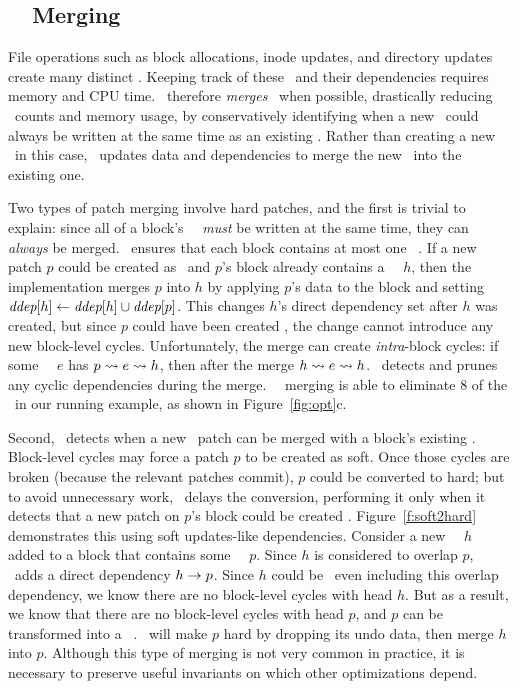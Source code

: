 
\subsection{\Nrb\ \Patch\ Merging}
\label{sec:patch:merge}

File operations such as block allocations, inode updates, and directory updates
create many distinct \patches. Keeping track of these
\patches\ and their dependencies requires memory and
CPU time.
%
\Kudos\ therefore \emph{merges} \patches\ when possible, drastically reducing
\patch\ counts and memory usage, by conservatively identifying when a
new \patch\ could always be written at the same time as an existing \patch.
%
Rather than creating a new \patch\ in this case, \Kudos\ updates data
and dependencies to merge the new \patch\ into the existing one.


Two types of patch merging involve hard patches, and the first is trivial
to explain:
%
since all of a block's \nrb\ \patches\ \emph{must} be written at the same
time, they can \emph{always} be merged.
%
\Kudos\ ensures that each block contains at most one \nrb\ \patch.
%
If a new patch $p$ could be created as \nrb\ and $p$'s
block already contains a \nrb\ \patch\ $h$, then
%
the implementation merges $p$ into $h$ by applying $p$'s data to the block
and setting $\textit{ddep}[h] \gets \textit{ddep}[h] \cup \textit{ddep}[p]$.
%
%
This changes $h$'s direct dependency set after $h$ was created, but
since $p$ could have been created \nrb, the change cannot introduce any new
block-level cycles.
%
Unfortunately, the merge can create \emph{intra}-block cycles:
%
if some \noop\ \patch\ $e$ has $p \leadsto e \leadsto h$, then after
the merge $h \leadsto e \leadsto h$.
%
\Kudos\ detects and prunes any cyclic
dependencies during the merge.
%
\Nrb\ \patch\ merging is able to eliminate 8 of the \patches\ in our running
example, as shown in Figure~\ref{fig:opt}c.


Second, \Featherstitch\ detects when a new \nrb\ patch can be merged with
 a block's existing \emph{\rb} \patches.
%
Block-level cycles may force a patch $p$ to be created as soft.
%
Once those cycles are broken (because the relevant patches commit), $p$
 could be converted to hard; but to avoid unnecessary work,
%
\Kudos\ delays the conversion, performing it only when it detects that a
 new patch on $p$'s block could be created \nrb.
%
Figure~\ref{f:soft2hard} demonstrates this using soft
 updates-like dependencies.
%
Consider a new \nrb\ \patch\ $h$ added to a block that
contains some \rb\ \patch\ $p$.
%
Since $h$ is considered to overlap $p$, \Kudos\ adds a direct dependency
$h \rightarrow p$.
%
Since $h$ could be \nrb\ even including this overlap dependency, we know
there are no block-level cycles with head $h$.
%
But as a result, we know that there are no block-level cycles
with head $p$, and
%
$p$ can be transformed into a \nrb\ \patch.  \Kudos\ will make $p$
hard by dropping its undo data, then merge $h$ into $p$.
%
Although this type of merging is not very common in practice, it is
 necessary to preserve useful invariants on which other optimizations
 depend.



